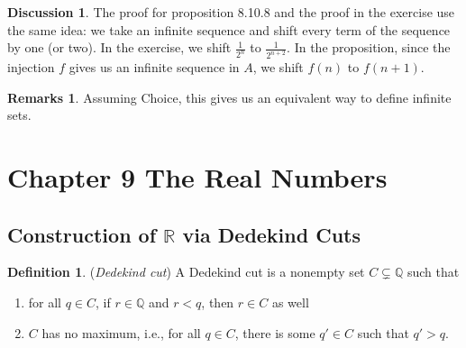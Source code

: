 \documentclass[14pt]{article}
\theoremstyle{definition}
\newtheorem*{remark}{Remarks}
\newtheorem*{discussion}{Discussion}
\newtheorem{definition}{Definition}[subsection]
\newcommand{\bb}[1]{\mathbb{#1}}
\begin{document}
\begin{discussion}
    The proof for proposition 8.10.8 and the proof in the exercise use the same idea:
    we take an infinite sequence and shift every term of the sequence by one (or two).
    In the exercise, we shift $\frac{1}{2^n}$ to $\frac{1}{2^{n+2}}$. In the proposition,
    since the injection $f$ gives us an infinite sequence in $A$, we shift $f(n)$ to 
    $f(n+1)$.

\end{discussion}


\begin{remark}
    Assuming Choice, this gives us an equivalent way to define infinite sets.
\end{remark}

\newpage

\section{Chapter 9 The Real Numbers}

\subsection {Construction of $\bb{R}$ via Dedekind Cuts}
\begin{definition}
   (\textit{Dedekind cut}) A Dedekind cut is a nonempty set $C\subsetneq \bb{Q}$ such that
    \begin{enumerate}
        \item for all $q\in C$, if $r\in \bb{Q}$ and $r<q$, then $r\in C$ as well
        \item $C$ has no maximum, i.e., for all $q\in C$, there is some $q'\in C$ 
        such that $q'>q$.
    \end{enumerate}
\end{definition}
\end{document}
